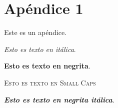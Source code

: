 \chapter{Apéndice 1} \label{app1}
Este es un apéndice.

\textit{Esto es texto en itálica}.

\textbf{Esto es texto en negrita}.

\textsc{Esto es texto en Small Caps}

\textit{\textbf{Esto es texto en negrita itálica}}.
